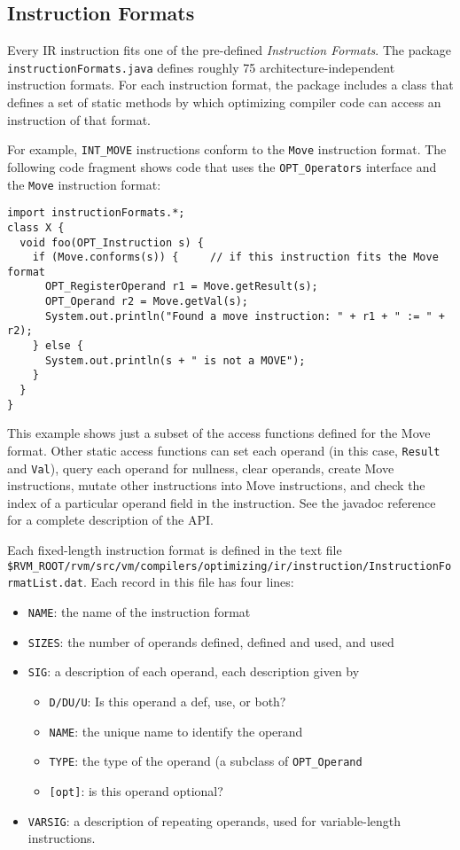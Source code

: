 \subsection{Instruction Formats}\label{iformats}

Every IR instruction fits one of the pre-defined {\em Instruction Formats}.
The package {\tt instructionFormats.java} defines roughly 75 architecture-independent
instruction formats.  For each instruction format, the package includes a class
that defines a set of static methods by which optimizing compiler
code can access an instruction of that format.

For example, {\tt INT\_MOVE} instructions conform to the {\tt Move}
instruction format.  The following code fragment shows code that uses the
{\tt OPT\_Operators} interface and the {\tt Move} instruction format:
\begin{verbatim}
import instructionFormats.*;
class X {
  void foo(OPT_Instruction s) {
    if (Move.conforms(s)) {     // if this instruction fits the Move format
      OPT_RegisterOperand r1 = Move.getResult(s);
      OPT_Operand r2 = Move.getVal(s);
      System.out.println("Found a move instruction: " + r1 + " := " + r2);
    } else {
      System.out.println(s + " is not a MOVE");
    }
  }
}
\end{verbatim}

This example shows just a subset of the access functions defined for the
Move format.  Other static access functions can set each operand 
(in this case, {\tt Result} and {\tt Val}), query each operand for
nullness, clear operands, create Move instructions, mutate other
instructions into Move instructions, and check the index of a particular
operand field in the instruction.  See the javadoc reference for a complete
description of the API.

Each fixed-length instruction format is defined in the text file 
{\tt \$RVM\_ROOT/rvm/src/vm/compilers/optimizing/ir/instruction/InstructionFormatList.dat}.
Each record in this file has four lines:
\begin{itemize}
\item {\tt NAME}: the name of the instruction format
\item {\tt SIZES}: the number of operands defined, defined and used, and used 
\item {\tt SIG}: a description of each operand, each description given
by
\begin{itemize}
\item {\tt D/DU/U}: Is this operand a def, use, or both?
\item {\tt NAME}: the unique name to identify the operand
\item {\tt TYPE}: the type of the operand (a subclass of {\tt OPT\_Operand}
\item {\tt [opt]}: is this operand optional?
\end{itemize}
\item {\tt VARSIG}: a description of repeating operands, used for
variable-length instructions.
\end{itemize}

